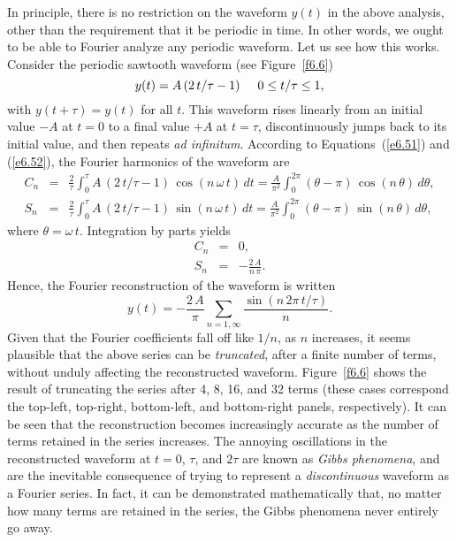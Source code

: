 In principle, there is no restriction on the waveform $y(t)$ in the above analysis, other
than the requirement that it be periodic in time. In other words, we ought to be able
to Fourier analyze any periodic waveform. Let us see how this works. Consider
the periodic sawtooth waveform (see Figure~\ref{f6.6})
\begin{equation}
y(t) = A\,(2\,t/\tau-1) \mbox{\hspace{0.5cm}$0\leq t/\tau \leq 1$},
\end{equation}
with $y(t+\tau)=y(t)$ for all $t$. This waveform rises linearly from an initial
value $-A$ at $t=0$ to a final value $+A$ at $t=\tau$, discontinuously jumps
back to its initial value, and then repeats {\em ad infinitum}. 
According to Equations~(\ref{e6.51}) and
(\ref{e6.52}), the Fourier harmonics of the waveform are
\begin{eqnarray}
C_n &=& \frac{2}{\tau}\int_0^\tau A\,(2\,t/\tau-1)\,\cos(n\,\omega\,t)\,dt = \frac{A}{\pi^2}\int_0^{2\pi} (\theta-\pi)\,\cos(n\,\theta)\,d\theta,\\[0.5ex]
S_n &=& \frac{2}{\tau}\int_0^\tau A\,(2\,t/\tau-1)\,\sin(n\,\omega\,t)\,dt = \frac{A}{\pi^2}\int_0^{2\pi} (\theta-\pi)\,\sin(n\,\theta)\,d\theta,
\end{eqnarray}
where $\theta=\omega\,t$. 
Integration by parts yields
\begin{eqnarray}
C_n &=& 0,\\[0.5ex]
S_n &=& - \frac{2\,A}{n\,\pi}.
\end{eqnarray}
Hence, the Fourier reconstruction of the waveform is written
\begin{equation}
y(t) = - \frac{2\,A}{\pi}\sum_{n=1,\infty} \frac{\sin(n\,2\pi\,t/\tau)}{n}.
\end{equation}
Given that the Fourier coefficients fall off like $1/n$, as $n$ increases, it seems plausible that the above
series can be {\em truncated}, after a finite number of terms, without unduly affecting the reconstructed waveform. Figure~\ref{f6.6} shows
the result of truncating the series after 4, 8,  16, and 32 terms (these cases correspond  the top-left, top-right,
bottom-left, and bottom-right panels, respectively). It can be seen that the reconstruction
becomes increasingly accurate as the number of terms retained in the series increases. 
The annoying oscillations in the reconstructed waveform at $t=0$, $\tau$, and $2\tau$ are
known as {\em Gibbs phenomena}, and are the inevitable consequence of trying
to represent a {\em discontinuous}\/ waveform as a Fourier series. In fact, it can be demonstrated
mathematically that, no matter how many terms are retained in the series, the Gibbs
phenomena never entirely go away. 

